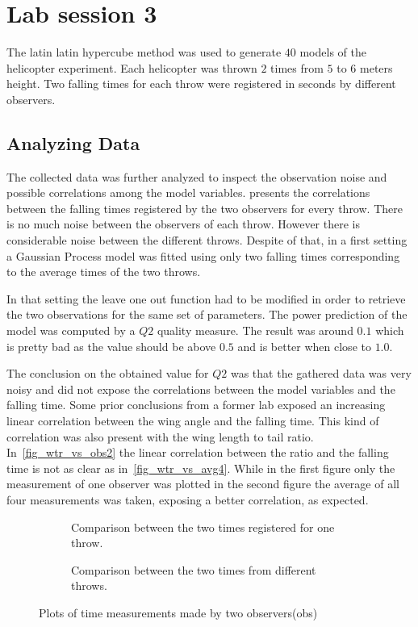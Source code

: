 \section{Lab session 3}

The latin latin hypercube method was used to generate $40$ models of the
helicopter experiment. Each helicopter was thrown $2$ times from $5$ to $6$
meters height. Two falling times for each throw were registered in seconds by
different observers.

\subsection{Analyzing Data}

The collected data was further analyzed to inspect the observation noise and
possible correlations among the model variables. 
presents the correlations between the falling times registered by the two
observers for every throw. There is no much noise between the observers of each
throw. However there is considerable noise between the different throws. Despite
of that, in a first setting a Gaussian Process model was fitted using only two
falling times corresponding to the average times of the two throws.

In that setting the leave one out function had to be modified in order to
retrieve the two observations for the same set of parameters. The power
prediction of the model was computed by a $Q2$ quality measure. The result was
around $0.1$ which is pretty bad as the value should be above $0.5$ and is
better when close to $1.0$.

The conclusion on the obtained value for $Q2$  was that the gathered data was
very noisy and did not expose the correlations between the model variables and
the falling time. Some prior conclusions from a former lab exposed an increasing
linear correlation between the wing angle and the falling time. This kind of
correlation was also present with the wing length to tail ratio.
In~\cref{fig_wtr_vs_obs2} the linear correlation between the ratio and the
falling time is not as clear as in~\cref{fig_wtr_vs_avg4}. While in the first
figure only the measurement of one observer was plotted in the second figure the
average of all four measurements was taken, exposing a better correlation, as
expected.

\begin{figure}
	\begin{subfigure}[h]{.5\linewidth}
		
		\caption{Comparison between the two times registered for one throw.}
		\label{fig_EX1_EX1}
	\end{subfigure}
	\begin{subfigure}[h]{.5\linewidth}
		
		\caption{Comparison between the two times from different throws.}
		\label{fig_EX1_EX2}
	\end{subfigure}
	\caption{Plots of time measurements made by two observers(obs)}
\end{figure}

